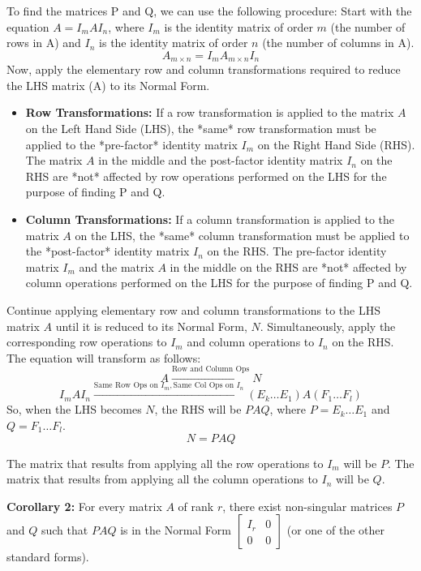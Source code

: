 \documentclass{article}
\begin{document}
To find the matrices P and Q, we can use the following procedure:
Start with the equation $A = I_m A I_n$, where $I_m$ is the identity matrix of order $m$ (the number of rows in A) and $I_n$ is the identity matrix of order $n$ (the number of columns in A).
\[ A_{m \times n} = I_m A_{m \times n} I_n \]
Now, apply the elementary row and column transformations required to reduce the LHS matrix (A) to its Normal Form.
\begin{itemize}
    \item \textbf{Row Transformations:} If a row transformation is applied to the matrix $A$ on the Left Hand Side (LHS), the *same* row transformation must be applied to the *pre-factor* identity matrix $I_m$ on the Right Hand Side (RHS). The matrix $A$ in the middle and the post-factor identity matrix $I_n$ on the RHS are *not* affected by row operations performed on the LHS for the purpose of finding P and Q.
    \item \textbf{Column Transformations:} If a column transformation is applied to the matrix $A$ on the LHS, the *same* column transformation must be applied to the *post-factor* identity matrix $I_n$ on the RHS. The pre-factor identity matrix $I_m$ and the matrix $A$ in the middle on the RHS are *not* affected by column operations performed on the LHS for the purpose of finding P and Q.
\end{itemize}
Continue applying elementary row and column transformations to the LHS matrix $A$ until it is reduced to its Normal Form, $N$. Simultaneously, apply the corresponding row operations to $I_m$ and column operations to $I_n$ on the RHS. The equation will transform as follows:
\[ A \xrightarrow{\text{Row and Column Ops}} N \]
\[ I_m A I_n \xrightarrow{\text{Same Row Ops on } I_m, \text{Same Col Ops on } I_n} (E_k \dots E_1) A (F_1 \dots F_l) \]
So, when the LHS becomes $N$, the RHS will be $PAQ$, where $P = E_k \dots E_1$ and $Q = F_1 \dots F_l$.
\[ N = PAQ \]

The matrix that results from applying all the row operations to $I_m$ will be $P$.
The matrix that results from applying all the column operations to $I_n$ will be $Q$.

\textbf{Corollary 2:}
For every matrix $A$ of rank $r$, there exist non-singular matrices $P$ and $Q$ such that $PAQ$ is in the Normal Form $\begin{bmatrix} I_r & 0 \\ 0 & 0 \end{bmatrix}$ (or one of the other standard forms).
\end{document}
